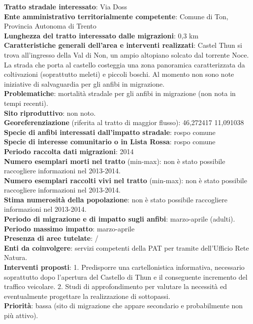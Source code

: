 \documentclass[11pt,a4paper,twoside]{memoir}
\begin{document}
\textbf{Tratto stradale interessato}: Via Doss \\
\textbf{Ente amministrativo territorialmente competente}: Comune di Ton, Provincia Autonoma di Trento  \\
\textbf{Lunghezza del tratto interessato dalle migrazioni}: 0,3 km \\
\textbf{Caratteristiche generali dell’area e interventi realizzati}: Castel Thun si trova all'ingresso della Val di Non, un ampio altopiano solcato dal torrente Noce. La strada che porta al castello costeggia una zona panoramica caratterizzata da coltivazioni (soprattutto meleti) e piccoli boschi. Al momento non sono note iniziative di salvaguardia per gli anfibi in migrazione. \\
\textbf{Problematiche}: mortalità stradale per gli anfibi in migrazione (non nota in tempi recenti).  \\
\textbf{Sito riproduttivo}: non noto. \\
\textbf{Georeferenziazione} (riferita al tratto di maggior flusso): 46,272417 11,091038 \\
\textbf{Specie di anfibi interessati dall’impatto stradale}: rospo comune \\
\textbf{Specie di interesse comunitario o in Lista Rossa}: rospo comune \\
\textbf{Periodo raccolta dati migrazioni}: 2014 \\
\textbf{Numero esemplari morti nel tratto} (min-max): non è stato possibile raccogliere informazioni nel 2013-2014.  \\
\textbf{Numero esemplari raccolti vivi nel tratto} (min-max):  non è stato possibile raccogliere informazioni nel 2013-2014.   \\
\textbf{Stima numerosità della popolazione}: non è stato possibile raccogliere informazioni nel 2013-2014.  \\
\textbf{Periodo di migrazione e di impatto sugli anfibi}: marzo-aprile (adulti). \\
\textbf{Periodo massimo impatto}: marzo-aprile \\
\textbf{Presenza di aree tutelate}: / \\
\textbf{Enti da coinvolgere}: servizi competenti della PAT per tramite dell’Ufficio Rete Natura. \\
\textbf{Interventi proposti}: 1. Predisporre una cartellonistica informativa, necessario soprattutto dopo l’apertura del Castello di Thun e il conseguente incremento del traffico veicolare. 2. Studi di approfondimento per valutare la necessità ed eventualmente progettare la realizzazione di sottopassi.  \\
\textbf{Priorità}: bassa (sito di migrazione che appare secondario e probabilmente non più attivo). \\
\end{document}
